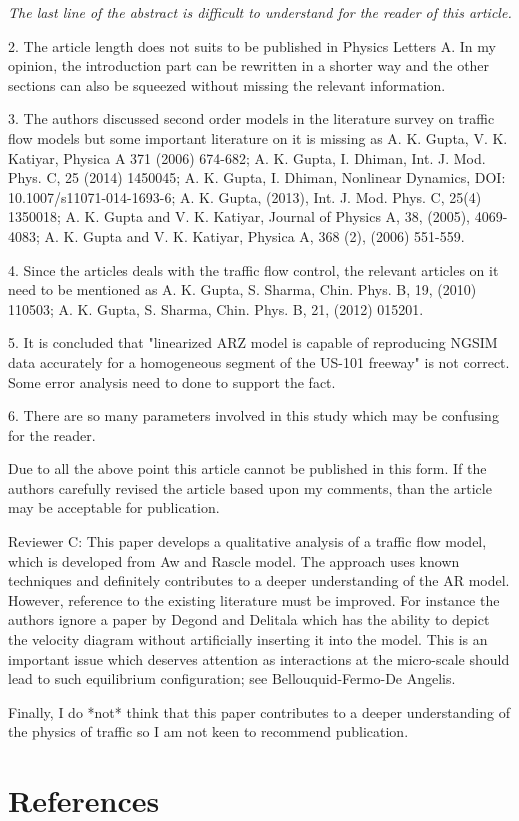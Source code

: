 \documentclass{article}
\begin{document}
\emph{
The last line of the abstract is difficult to understand for the reader of this article.
}


2. The article length does not suits to be published in Physics Letters A. In my opinion, the introduction part can be rewritten in a shorter way and the other sections can also be squeezed without missing the relevant information.

3. The authors discussed second order models in the literature survey on traffic flow models but some important literature on it is missing as A. K. Gupta, V. K. Katiyar, Physica A 371 (2006) 674-682;  A. K. Gupta, I. Dhiman, Int. J. Mod. Phys. C, 25 (2014) 1450045; A. K. Gupta, I. Dhiman, Nonlinear Dynamics, DOI: 10.1007/s11071-014-1693-6; A. K. Gupta, (2013), Int. J. Mod. Phys. C, 25(4) 1350018; A. K. Gupta and V. K. Katiyar, Journal of Physics A, 38, (2005), 4069-4083; A. K. Gupta and V. K. Katiyar, Physica A, 368 (2), (2006) 551-559.

4. Since the articles deals with the traffic flow control, the relevant articles on it need to be mentioned as A. K. Gupta, S. Sharma, Chin. Phys. B, 19, (2010) 110503; A. K. Gupta, S. Sharma, Chin. Phys. B, 21, (2012) 015201.

5. It is concluded that "linearized ARZ model is capable of reproducing NGSIM data accurately for a homogeneous segment of the US-101 freeway" is not correct. Some error analysis need to done to support the fact.

6. There are so many parameters involved in this study which may be confusing for the reader.

Due to all the above point this article cannot be published in this form. If the authors carefully revised the article based upon my comments, than the article may be acceptable for publication.




\newpage

Reviewer C: This paper develops a qualitative analysis of a traffic flow model, which is developed from Aw and Rascle model. The approach uses known techniques and definitely contributes to a deeper understanding of the AR model. However, reference to the existing literature must be improved. For instance the authors ignore a paper by Degond and Delitala which has the ability to depict the velocity diagram without artificially inserting it into the model. This is an important issue which deserves attention as interactions at the micro-scale should lead to such equilibrium configuration; see Bellouquid-Fermo-De Angelis.

Finally, I do *not* think that this paper contributes to a deeper understanding of the physics of traffic so I am not keen to recommend publication.

\section*{References}

\end{document}
